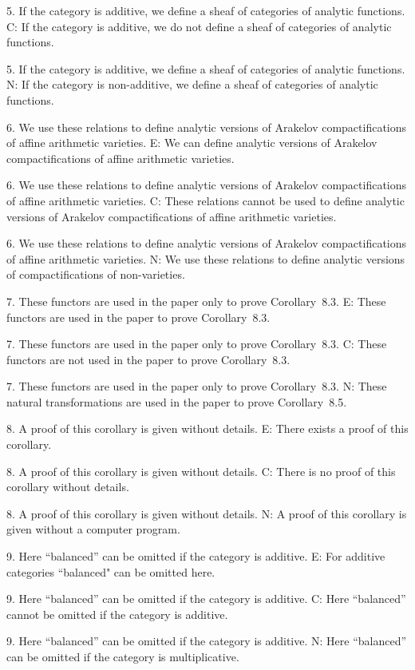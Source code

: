 5. If the category is additive, we define a sheaf of categories of analytic functions.
C: If the category is additive, we do not define a sheaf of categories of analytic functions.

5. If the category is additive, we define a sheaf of categories of analytic functions.
N: If the category is non-additive, we define a sheaf of categories of analytic functions.

6. We use these relations to define analytic versions of Arakelov compactifications of affine arithmetic varieties.
E: We can define analytic versions of Arakelov compactifications of affine arithmetic varieties.

6. We use these relations to define analytic versions of Arakelov compactifications of affine arithmetic varieties.
C: These relations cannot be used to define analytic versions of Arakelov compactifications of affine arithmetic varieties.

6. We use these relations to define analytic versions of Arakelov compactifications of affine arithmetic varieties.
N: We use these relations to define analytic versions of  compactifications of non-varieties.

7. These functors are used in the paper only to prove Corollary~8.3.
E: These functors are used in the paper  to prove Corollary~8.3.

7. These functors are used in the paper only to prove Corollary~8.3.
C: These functors are not used in the paper  to prove Corollary~8.3.

7. These functors are used in the paper only to prove Corollary~8.3.
N: These natural transformations are used in the paper  to prove Corollary~8.5.

8. A proof of this corollary is given without details.
E: There exists a proof of this corollary.

8. A proof of this corollary is given without details.
C: There is no proof of this corollary without details.

8. A proof of this corollary is given without details.
N: A proof of this corollary is given without a computer program.

9. Here ``balanced'' can be omitted if the category is additive.
E: For additive categories ``balanced" can be omitted here.

9. Here ``balanced'' can be omitted if the category is additive.
C: Here ``balanced'' cannot be omitted if the category is additive.

9. Here ``balanced'' can be omitted if the category is additive.
N: Here ``balanced'' can be omitted if the category is multiplicative.

